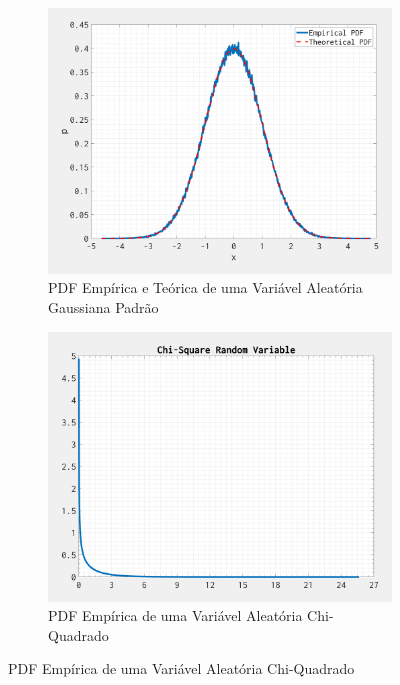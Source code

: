 \documentclass{article}
\begin{document}
\begin{figure}[H]
    \centering
    \begin{subfigure}[t]{.5\textwidth}
        \centering
        \includegraphics[scale=0.22]{figures/Gaussian-PDF.png}
        \caption{PDF Empírica e Teórica de uma Variável Aleatória Gaussiana Padrão}
    \end{subfigure}%
    \begin{subfigure}[t]{.5\textwidth}
        \centering
        \includegraphics[scale=0.22]{figures/Chi-Square-PDF.png}
        \caption{PDF Empírica de uma Variável Aleatória Chi-Quadrado}
    \end{subfigure}
\end{figure}
\end{document}
